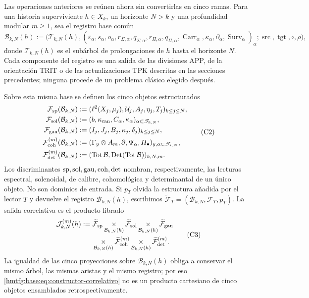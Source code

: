 Las operaciones anteriores se reúnen ahora sin convertirlas en cinco ramas.
Para una historia superviviente \(h\in X_k\), un horizonte \(N>k\) y una
profundidad modular \(m\geq1\), sea el registro base común
\[
 \mathcal B_{k,N}(h):=
 \bigl(\mathscr T_{k,N}(h),
       (\varepsilon_\alpha,s_\alpha,o_\alpha,
        r_{\Sigma,\alpha},q_{\Sigma,\alpha},
        r_{\Pi,\alpha},q_{\Pi,\alpha},
        \operatorname{Carr}_\alpha,
        \kappa_\alpha,\partial_\alpha,
        \operatorname{Surv}_\alpha)_\alpha;
       \operatorname{src},\operatorname{tgt},\circ,\rho\bigr),
 \tag{C1}
 \label{hmtfg:base:eq:base-comun-registros}
\]
donde \(\mathscr T_{k,N}(h)\) es el subárbol de prolongaciones de \(h\)
hasta el horizonte \(N\). Cada componente del registro es una salida de las
divisiones APP, de la orientación TRIT o de las actualizaciones TPK descritas
en las secciones precedentes; ninguna procede de un problema clásico elegido
después.

Sobre esta misma base se definen los cinco objetos estructurados
\[
\begin{aligned}
 \mathcal F_{\rm sp}(\mathcal B_{k,N})
   &:=(\ell^2(X_j,\mu_j),\mathcal U_j,A_j,\eta_j,T_j)_{k\leq j\leq N},\\
 \mathcal F_{\rm sol}(\mathcal B_{k,N})
   &:=(b,\kappa_{\rm can},C_\alpha,\kappa_\alpha)_{\alpha\subset\mathscr T_{k,N}},\\
 \mathcal F_{\rm gau}(\mathcal B_{k,N})
   &:=(I_j,J_j,B_j,\kappa_j,\delta_j)_{k\leq j\leq N},\\
 \mathcal F_{\rm coh}^{(m)}(\mathcal B_{k,N})
   &:=(\Gamma_y\otimes A_m,\partial,\Psi_\alpha,H_\bullet)_{y,\alpha\subset\mathscr T_{k,N}},\\
 \mathcal F_{\rm det}^{(m)}(\mathcal B_{k,N})
   &:=(\operatorname{Tot}\mathcal B,\operatorname{Det}(\operatorname{Tot}\mathcal B))_{k,N,m}.
\end{aligned}
 \tag{C2}
\]
Los discriminantes \({\rm sp},{\rm sol},{\rm gau},{\rm coh},{\rm det}\)
nombran, respectivamente, las lecturas espectral, solenoidal, de calibre,
cohomológica y determinantal de un único objeto. No son dominios de entrada.
Si \(p_T\) olvida la estructura añadida por el lector \(T\) y devuelve el
registro \(\mathcal B_{k,N}(h)\), escribimos
\(\widetilde{\mathcal F}_T=(\mathcal B_{k,N},\mathcal F_T,p_T)\). La salida
correlativa es el producto fibrado
\[
\begin{aligned}
 \mathcal J_{k,N}^{(m)}(h):={}&
 \widetilde{\mathcal F}_{\rm sp}
 \mathop{\times}_{\mathcal B_{k,N}(h)}
 \widetilde{\mathcal F}_{\rm sol}
 \mathop{\times}_{\mathcal B_{k,N}(h)}
 \widetilde{\mathcal F}_{\rm gau}\\
 &\mathop{\times}_{\mathcal B_{k,N}(h)}
 \widetilde{\mathcal F}_{\rm coh}^{(m)}
 \mathop{\times}_{\mathcal B_{k,N}(h)}
 \widetilde{\mathcal F}_{\rm det}^{(m)}.
\end{aligned}
 \tag{C3}
 \label{hmtfg:base:eq:constructor-correlativo}
\]
La igualdad de las cinco proyecciones sobre \(\mathcal B_{k,N}(h)\) obliga a
conservar el mismo árbol, las mismas aristas y el mismo registro; por eso
\eqref{hmtfg:base:eq:constructor-correlativo} no es un producto cartesiano de cinco
objetos ensamblados retrospectivamente.

